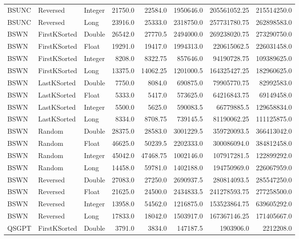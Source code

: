 \documentclass[unicode,11pt,a4paper,oneside,numbers=endperiod,openany]{scrartcl}
\begin{document}
\begin{center}
\begin{longtable}{|l|l|l|r|r|r|r|r|}
            BSUNC & Reversed & Integer & 21750.0 & 22584.0 & 1950646.0 & 205561052.25 & 215514250.0 \\
            BSUNC & Reversed & Long & 23916.0 & 25333.0 & 2318750.0 & 257731780.75 & 262898583.0 \\
            BSWN & FirstKSorted & Double & 26542.0 & 27770.5 & 2494000.0 & 269238020.75 & 273290750.0 \\
            BSWN & FirstKSorted & Float & 19291.0 & 19417.0 & 1994313.0 & 220615062.5 & 226031458.0 \\
            BSWN & FirstKSorted & Integer & 8208.0 & 8322.75 & 857646.0 & 94190728.75 & 109389625.0 \\
            BSWN & FirstKSorted & Long & 13375.0 & 14062.25 & 1201000.5 & 164325427.25 & 182960625.0 \\
            BSWN & LastKSorted & Double & 7750.0 & 8084.0 & 690875.0 & 79905770.75 & 82992583.0 \\
            BSWN & LastKSorted & Float & 5333.0 & 5417.0 & 573625.0 & 64216843.75 & 69149458.0 \\
            BSWN & LastKSorted & Integer & 5500.0 & 5625.0 & 590083.5 & 66779885.5 & 129658834.0 \\
            BSWN & LastKSorted & Long & 8334.0 & 8708.75 & 739145.5 & 81190062.25 & 111125875.0 \\
            BSWN & Random & Double & 28375.0 & 28583.0 & 3001229.5 & 359720093.5 & 366413042.0 \\
            BSWN & Random & Float & 46625.0 & 50239.5 & 2202333.0 & 300086094.0 & 384812458.0 \\
            BSWN & Random & Integer & 45042.0 & 47468.75 & 1002146.0 & 107917281.5 & 122899292.0 \\
            BSWN & Random & Long & 14458.0 & 59781.0 & 1402188.0 & 194750969.0 & 226067959.0 \\
            BSWN & Reversed & Double & 27083.0 & 27250.0 & 2690937.5 & 280814093.5 & 285547250.0 \\
            BSWN & Reversed & Float & 21625.0 & 24500.0 & 2434833.5 & 241278593.75 & 277258500.0 \\
            BSWN & Reversed & Integer & 13958.0 & 54562.0 & 1216875.0 & 153523864.75 & 639605292.0 \\
            BSWN & Reversed & Long & 17833.0 & 18042.0 & 1503917.0 & 167367146.25 & 171405667.0 \\
            QSGPT & FirstKSorted & Double & 3791.0 & 3834.0 & 147187.5 & 1903906.0 & 2212208.0 \\

\end{longtable}
\end{center}
\end{document}
